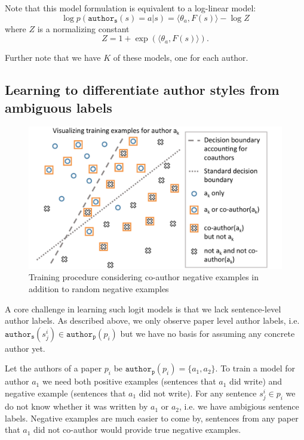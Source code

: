 Note that this model formulation is equivalent to a log-linear model:
$$\log p(\mathtt{author_s}(s)=a | s) = \langle\theta_a, F(s)\rangle - \log Z$$
where $Z$ is a normalizing constant 
$$Z= 1 + \exp(\langle\theta_a, F(s)\rangle).$$

Further note that we have $K$ of these models, one for each author.


\subsection{Learning to differentiate author styles from ambiguous labels}
\label{subsec:fancy_training}

\begin{figure}[t]
\begin{center}
\includegraphics[width=\linewidth]{fancy_training.pdf}
\caption{Training procedure considering co-author negative examples in addition to random negative examples}
\label{fig:fancy_training}
\end{center}
\end{figure}


A core challenge in learning such logit models is that we lack sentence-level author labels.
As described above, we only observe paper level author labels, i.e. $\mathtt{author_s}(s_j^i) \in \mathtt{author_p}(p_i)$ but we have no basis for assuming any concrete author yet.

Let the authors of a paper $p_i$ be $\mathtt{author_p}(p_i) = \{ a_1, a_2\}$.
To train a model for author $a_1$ we need both positive examples (sentences that $a_1$ did write) and negative example (sentences that $a_1$ did not write). 
For any sentence $s_j^i \in p_i$ we do not know whether it was written by $a_1$ or $a_2$, i.e. we have ambigious sentence labels.
Negative examples are much easier to come by, sentences from any paper that $a_1$ did not co-author would provide true negative examples.

